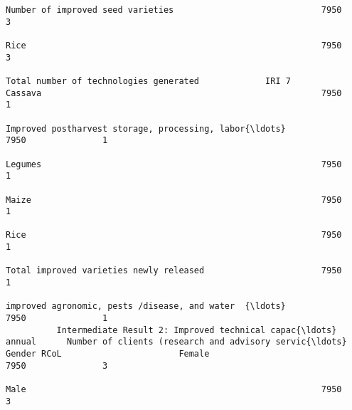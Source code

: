 \documentclass[11pt]{article}
\begin{document}
\begin{Verbatim}[commandchars=\\\{\}]
                                                                                                                                                              Number of improved seed varieties                             7950               3  
                                                                                                                                                              Rice                                                          7950               3  
                                                                         Total number of technologies generated             IRI 7                             Cassava                                                       7950               1  
                                                                                                                                                              Improved postharvest storage, processing, labor{\ldots}            7950               1  
                                                                                                                                                              Legumes                                                       7950               1  
                                                                                                                                                              Maize                                                         7950               1  
                                                                                                                                                              Rice                                                          7950               1  
                                                                                                                                                              Total improved varieties newly released                       7950               1  
                                                                                                                                                              improved agronomic, pests /disease, and water  {\ldots}            7950               1  
          Intermediate Result 2: Improved technical capac{\ldots} annual      Number of clients (research and advisory servic{\ldots} Gender RCoL                       Female                                                        7950               3  
                                                                                                                                                              Male                                                          7950               3  

\end{Verbatim}
\end{document}
